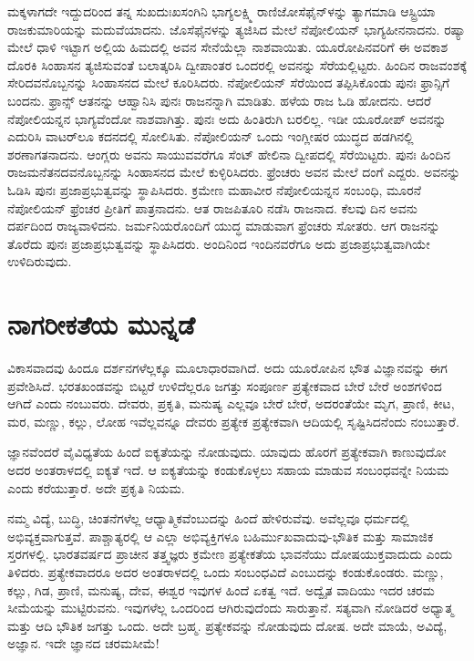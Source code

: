 ಮಕ್ಕಳಾಗದೇ ಇದ್ದುದರಿಂದ ತನ್ನ ಸುಖದುಃಖಸಂಗಿನಿ ಭಾಗ್ಯಲಕ್ಷ್ಮಿ ರಾಣಿ\break ಜೋಸೆಫೈನ್​ಳನ್ನು ತ್ಯಾಗಮಾಡಿ ಆಸ್ಟ್ರಿಯಾ ರಾಜಕುಮಾರಿಯನ್ನು ಮದುವೆಯಾದನು. ಜೊಸೆಫೈನಳನ್ನು ತ್ಯಜಿಸಿದ ಮೇಲೆ ನೆಪೋಲಿಯನ್​ ಭಾಗ್ಯಹೀನನಾದನು. ರಷ್ಯಾ ಮೇಲೆ ಧಾಳಿ ಇಟ್ಟಾಗ ಅಲ್ಲಿಯ ಹಿಮದಲ್ಲಿ ಅವನ ಸೇನೆಯೆಲ್ಲಾ ನಾಶವಾಯಿತು. ಯೂರೋಪಿ\break ನವರಿಗೆ ಈ ಅವಕಾಶ ದೊರಕಿ ಸಿಂಹಾಸನ ತ್ಯಜಿಸುವಂತೆ ಬಲಾತ್ಕರಿಸಿ ದ್ವೀಪಾಂತರ ಒಂದರಲ್ಲಿ ಅವನನ್ನು ಸೆರೆಯಲ್ಲಿಟ್ಟರು. ಹಿಂದಿನ ರಾಜವಂಶಕ್ಕೆ ಸೇರಿದವನೊಬ್ಬನನ್ನು ಸಿಂಹಾಸನದ ಮೇಲೆ ಕೂರಿಸಿದರು. ನೆಪೋಲಿಯನ್​ ಸೆರೆಯಿಂದ ತಪ್ಪಿಸಿಕೊಂಡು ಪುನಃ ಫ್ರಾನ್ಸಿಗೆ ಬಂದನು. ಫ್ರಾನ್ಸ್​ ಆತನನ್ನು ಆಹ್ವಾನಿಸಿ ಪುನಃ ರಾಜನನ್ನಾಗಿ ಮಾಡಿತು. ಹಳೆಯ ರಾಜ ಓಡಿ ಹೋದನು. ಆದರೆ ನೆಪೋಲಿಯನ್ನನ ಭಾಗ್ಯವೆಂದೋ ನಾಶವಾಗಿತ್ತು. ಪುನಃ ಅದು ಹಿಂತಿರುಗಿ ಬರಲಿಲ್ಲ. ಇಡೀ ಯೂರೋಪ್​ ಅವನನ್ನು ಎದುರಿಸಿ ವಾಟರ್​ಲೂ ಕದನದಲ್ಲಿ ಸೋಲಿಸಿತು. ನೆಪೋಲಿಯನ್​ ಒಂದು ಇಂಗ್ಲೀಷರ ಯುದ್ಧದ ಹಡಗಿನಲ್ಲಿ ಶರಣಾಗತನಾದನು. ಆಂಗ್ಲರು ಅವನು ಸಾಯುವವರೆಗೂ ಸೆಂಟ್​ ಹೇಲಿನಾ ದ್ವೀಪದಲ್ಲಿ ಸೆರೆಯಿಟ್ಟರು. ಪುನಃ ಹಿಂದಿನ ರಾಜಮನೆತನದವನೊಬ್ಬನನ್ನು ಸಿಂಹಾಸನದ ಮೇಲೆ ಕುಳ್ಳಿರಿಸಿ\break ದರು. ಫ್ರೆಂಚರು ಅವನ ಮೇಲೆ ದಂಗೆ ಎದ್ದರು. ಅವನನ್ನು ಓಡಿಸಿ ಪುನಃ ಪ್ರಜಾಪ್ರಭುತ್ವವನ್ನು ಸ್ಥಾಪಿಸಿದರು. ಕ್ರಮೇಣ ಮಹಾವೀರ ನೆಪೋಲಿಯನ್ನನ ಸಂಬಂಧಿ, ಮೂರನೆ ನೆಪೋಲಿಯನ್​ ಫ್ರೆಂಚರ ಪ್ರೀತಿಗೆ ಪಾತ್ರನಾದನು. ಆತ ರಾಜಪಿತೂರಿ ನಡೆಸಿ ರಾಜನಾದ. ಕೆಲವು ದಿನ ಅವನು ದರ್ಪದಿಂದ ರಾಜ್ಯವಾಳಿದನು. ಜರ್ಮನಿಯರೊಂದಿಗೆ ಯುದ್ಧ ಮಾಡುವಾಗ ಫ್ರೆಂಚರು ಸೋತರು. ಆಗ ರಾಜನನ್ನು ತೊರೆದು ಪುನಃ ಪ್ರಜಾಪ್ರಭುತ್ವವನ್ನು ಸ್ಥಾಪಿಸಿದರು. ಅಂದಿನಿಂದ ಇಂದಿನವರೆಗೂ ಅದು ಪ್ರಜಾಪ್ರಭುತ್ವವಾಗಿಯೇ ಉಳಿದಿರುವುದು.

\newpage

\section*{ನಾಗರೀಕತೆಯ ಮುನ್ನಡೆ}

ವಿಕಾಸವಾದವು ಹಿಂದೂ ದರ್ಶನಗಳೆಲ್ಲಕ್ಕೂ ಮೂಲಾಧಾರವಾಗಿದೆ. ಅದು ಯೂರೋಪಿನ ಭೌತ ವಿಜ್ಞಾನವನ್ನು ಈಗ ಪ್ರವೇಶಿಸಿದೆ. ಭರತಖಂಡವನ್ನು ಬಿಟ್ಟರೆ ಉಳಿದೆಲ್ಲರೂ ಜಗತ್ತು ಸಂಪೂರ್ಣ ಪ್ರತ್ಯೇಕವಾದ ಬೇರೆ ಬೇರೆ ಅಂಶಗಳಿಂದ ಆಗಿದೆ ಎಂದು ನಂಬುವರು. ದೇವರು, ಪ್ರಕೃತಿ, ಮನುಷ್ಯ ಎಲ್ಲವೂ ಬೇರೆ ಬೇರೆ, ಅದರಂತೆಯೇ ಮೃಗ, ಪ್ರಾಣಿ, ಕೀಟ, ಮರ, ಮಣ್ಣು, ಕಲ್ಲು, ಲೋಹ ಇವೆಲ್ಲವನ್ನೂ ದೇವರು ಪ್ರತ್ಯೇಕ ಪ್ರತ್ಯೇಕವಾಗಿ ಆದಿಯಲ್ಲಿ ಸೃಷ್ಟಿಸಿದನೆಂದು ನಂಬುತ್ತಾರೆ.

\vskip 5pt

ಜ್ಞಾನವೆಂದರೆ ವೈವಿಧ್ಯತೆಯ ಹಿಂದೆ ಐಕ್ಯತೆಯನ್ನು ನೋಡುವುದು. ಯಾವುದು ಹೊರಗೆ ಪ್ರತ್ಯೇಕವಾಗಿ ಕಾಣುವುದೋ ಅದರ ಅಂತರಾಳದಲ್ಲಿ ಐಕ್ಯತೆ ಇದೆ. ಆ ಐಕ್ಯತೆಯನ್ನು ಕಂಡುಕೊಳ್ಳಲು ಸಹಾಯ ಮಾಡುವ ಸಂಬಂಧವನ್ನೇ ನಿಯಮ ಎಂದು ಕರೆಯುತ್ತಾರೆ. ಅದೇ ಪ್ರಕೃತಿ ನಿಯಮ.

\vskip 5pt

ನಮ್ಮ ವಿದ್ಯೆ, ಬುದ್ಧಿ, ಚಿಂತನೆಗಳೆಲ್ಲ ಆಧ್ಯಾತ್ಮಿಕವೆಂಬುದನ್ನು ಹಿಂದೆ ಹೇಳಿರುವೆವು. ಅವೆಲ್ಲವೂ ಧರ್ಮದಲ್ಲಿ ಅಭಿವ್ಯಕ್ತವಾಗುತ್ತವೆ. ಪಾಶ್ಚಾತ್ಯರಲ್ಲಿ ಆ ಎಲ್ಲಾ ಅಭಿವ್ಯಕ್ತಿಗಳೂ ಬಹಿರ್ಮುಖವಾದುವು-ಭೌತಿಕ ಮತ್ತು ಸಾಮಾಜಿಕ ಸ್ತರಗಳಲ್ಲಿ. ಭಾರತವರ್ಷದ ಪ್ರಾಚೀನ ತತ್ತ್ವಜ್ಞರು ಕ್ರಮೇಣ ಪ್ರತ್ಯೇಕತೆಯ ಭಾವನೆಯು ದೋಷಯುಕ್ತವಾದುದು ಎಂದು ತಿಳಿದರು. ಪ್ರತ್ಯೇಕವಾದರೂ ಅದರ ಅಂತರಾಳದಲ್ಲಿ ಒಂದು ಸಂಬಂಧವಿದೆ ಎಂಬುದನ್ನು ಕಂಡುಕೊಂಡರು. ಮಣ್ಣು, ಕಲ್ಲು, ಗಿಡ, ಪ್ರಾಣಿ, ಮನುಷ್ಯ, ದೇವ, ಈಶ್ವರ ಇವುಗಳ ಹಿಂದೆ ಏಕತ್ವ ಇದೆ. ಅದ್ವೈತ ವಾದಿಯು ಇದರ ಚರಮ ಸೀಮೆಯನ್ನು ಮುಟ್ಟಿರುವನು. ಇವುಗಳೆಲ್ಲ ಒಂದರಿಂದ ಆಗಿರುವುದೆಂದು ಸಾರುತ್ತಾನೆ. ಸತ್ಯವಾಗಿ ನೋಡಿದರೆ ಅಧ್ಯಾತ್ಮ ಮತ್ತು ಆದಿ ಭೌತಿಕ ಜಗತ್ತು ಒಂದು. ಅದೇ ಬ್ರಹ್ಮ. ಪ್ರತ್ಯೇಕವನ್ನು ನೋಡುವುದು ದೋಷ. ಅದೇ ಮಾಯೆ, ಅವಿದ್ಯೆ, ಅಜ್ಞಾನ. ಇದೇ ಜ್ಞಾನದ ಚರಮಸೀಮೆ!

